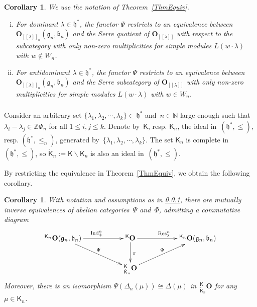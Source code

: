 \documentclass[11pt]{amsart}
\newcommand{\lbra}{[\![}
\newcommand{\rbra}{]\!]}
\newcommand{\KKK}{\mathsf{K}}
\newcommand{\rR}{\Phi}
\newcommand{\bO}{\mathbf{O}}
\newcommand{\fg}{\mathfrak{g}}
\newcommand{\fh}{\mathfrak{h}}
\newcommand{\fb}{\mathfrak{b}}
\newcommand{\mN}{\mathbb{N}}
\newcommand{\mZ}{\mathbb{Z}}
\numberwithin{equation}{section}
\theoremstyle{plain}
\newtheorem{cor}[subsubsection]{Corollary}
\theoremstyle{remark}
\theoremstyle{remark}
\theoremstyle{construction}
\newcommand{\ind}{{\rm Ind}}
\newcommand{\res}{{\rm Res}}
\begin{document}
\begin{cor}\label{CorEqBlocks} We use the notation of Theorem~\ref{ThmEquiv}.
\begin{enumerate}[(i)]
\item For dominant $\lambda\in\fh^\ast$, the functor $\Psi$ restricts to an equivalence between $\bO_{\lbra\lambda\rbra_n}(\fg_n,\fb_n)$ and the Serre quotient of $\bO_{\lbra\lambda\rbra}$ with respect to the subcategory with only non-zero multiplicities for simple modules $L(w\cdot\lambda)$ with $w\not\in W_n$.
\item For antidominant $\lambda\in\fh^\ast$, the functor $\Psi$ restricts to an equivalence between $\bO_{\lbra\lambda\rbra_n}(\fg_n,\fb_n)$ and the Serre subcategory of $\bO_{\lbra\lambda\rbra}$ with only non-zero multiplicities for simple modules $L(w\cdot\lambda)$ with $w\in W_n$.
\end{enumerate}
\end{cor}



\subsubsection{}\label{ForEquivK} Consider an arbitrary set $\{\lambda_1,\lambda_2,\cdots,\lambda_k\}\subset\fh^\ast$ and~$n\in\mN$ large enough such that~$\lambda_i-\lambda_j\in\mZ\rR_n$ for all $1\le i,j\le k$. Denote by~$\KKK$, resp. $\KKK_n$, the ideal in~$(\fh^\ast,\le)$, resp. $(\fh^\ast,\le_n)$, generated by~$\{\lambda_1,\lambda_2,\cdots,\lambda_k\}$. The set $\KKK_n$ is complete in~$(\fh^\ast,\le)$, so $\mathring{\KKK}_n:=\KKK\backslash \KKK_n$ is also an ideal in~$(\fh^\ast,\le)$. 

By restricting the equivalence in Theorem~\ref{ThmEquiv}, we obtain the following corollary.

\begin{cor}\label{CorEquiv}
With notation and assumptions as in \ref{ForEquivK}, {there are} mutually inverse equivalences of abelian categories~$\Psi$ and~$\Phi$, admitting a commutative diagram
$$
\xymatrix{
{}^{\KKK_n}\bO({\fg_n},\fb_n)\ar[rr]^{\ind^n_+}\ar[drr]^{\Psi}&&{}^{\KKK}\bO\ar[rr]^{\res_\lambda^n}\ar[d]^{\pi}&&{}^{\KKK_n}\bO({\fg_n},\fb_n)\\
&&{}^{\KKK}_{\mathring{\KKK}_n}\bO\ar[rru]^{\Phi}
}
$$
Moreover, {there is an isomorphism} $\Psi(\Delta_n(\mu))\cong\Delta(\mu)$ in~${}^{\KKK}_{\mathring{\KKK}_n}\bO$ for {any} $\mu\in {\KKK_n}$.
\end{cor}
\end{document}
